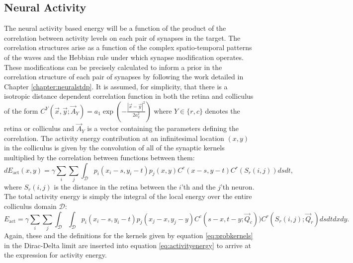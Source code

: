 \subsection{Neural Activity}
The neural activity based energy will be a function of the product of the correlation between activity levels on each pair of synapses in the target. The correlation structures arise as a function of the complex spatio-temporal patterns of the waves and the Hebbian rule under which synapse modification operates. These modifications can be precisely calculated to inform a prior in the correlation structure of each pair of synapses by following the work detailed in Chapter \ref{chapter:neuralstdp}. It is assumed, for simplicity, that there is a isotropic distance dependent correlation function in both the retina and colliculus of the form $C^Y(\vec{x}, \vec{y}; \vec{A}_Y)  = a_1\exp\left(-\frac{\left| \vec{x} - \vec{y}\right|^2}{2 a_2^2}\right)$ where $Y \in \{r,c\}$ denotes the retina or colliculus and $\vec{A}_Y$ is a vector containing the parameters defining the correlation. The activity energy contribution at an infinitesimal location $(x,y)$ in the colliculus is given by the convolution of all of the synaptic kernels multiplied by the correlation between functions between them:
\begin{equation} \label{eq:activityenergy}
dE_\text{act}(x, y) = \gamma \sum_i \sum_j \int_{\mathcal{D}} p_i(x_i - s, y_i - t)p_j(x, y) C^c(x - s, y - t)C^r(S_r(i, j)) ds dt,
\end{equation}
where $S_r(i,j)$ is the distance in the retina between the $i$'th and the $j$'th neuron. The total activity energy is simply the integral of the local energy over the entire colliculus domain $\mathcal{D}$:
\begin{equation}
E_\text{act} = \gamma \sum_i \sum_j \int_{\mathcal{D}} \int_{\mathcal{D}}p_i(x_i - s, y_i - t)p_j(x_j-x,y_j-y) C^c(s -x, t - y; \vec{Q}_c))C^r(S_r(i, j); \vec{Q}_r) ds dt dx dy.
\end{equation}
Again, these and the definitions for the kernels given by equation \ref{eq:probkernels} in the Dirac-Delta limit are inserted into equation \ref{eq:activityenergy} to arrive at the expression for activity energy.
